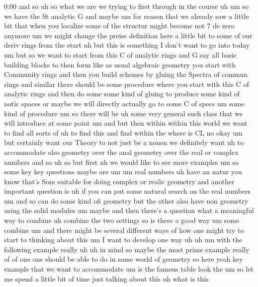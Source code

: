 \begin{unfinished}{0:00}
and
so
uh
so  what  we  are  we  trying  to  first
through  in  the
course
uh  um  so  we  have  the  St  analytic  G  and
maybe  um  for  reason  that  we  already  saw
a  little  bit  that  when  you
localize  some  of  the  structur  might
become  not  7  de  zero  anymore  um  we  might
change  the  preise  definition  here  a
little  bit  to  some  of  our  deriv  rings
from  the  start  uh  but  this  is  something
I  don't  want  to  go  into  today
um  but  so  we  want  to  start  from  this  C
of  analytic  rings  and  G  say  all  basic
building  blocks  to  then
form  like  as  usual  algebraic  geometry
you  start  with  Community  rings  and  then
you  build  schemes  by  gluing  the  Spectra
of  commun  rings  and  similar  there  should
be  some  procedure  where  you  start  with
this  C  of  analytic  rings  and  then  do
some  some  kind  of  gluing  to  produce  some
kind  of  notic  spaces  or  maybe  we  will
directly  actually  go  to  some  C  of
specs
um  some  kind  of
procedure
um
so  there  will  be
uh  some  very  general  such  class  that  we
will  introduce  at  some  point
um  and  but  then  within  within  this  world
we  want  to  find  all  sorts  of  uh  to
find  this  and  find  within
the
where  is
CL
no
okay  um  but  certainly  want  our  Theory  to
not  just  be  a  nonen  we  definitely  want
uh  to  accommodate  also  geometry  over  the
anal  geometry  over  the  real  or  complex
numbers  and
so  uh  so  but
first  uh  we  would  like  to  see  more
examples
um
so  some  key  key  questions  maybe
are
um
um  real
numbers  uh  have  an
natur  you  know  that's  Som  suitable  for
doing  complex  or  realic
geometry  and  another  important  question
is  uh  if  you  can  put  some  natural  search
on  the  real  numbers
um  and  so  can  do  some  kind  ofi  geometry
but  the  other  also  have  non  geometry
using  the  solid  modules  um  maybe  and
then  there's  a  question  what  a
meaningful  way  to  combine  uh  combine  the
two  settings  so  is  there  a  good
way  um  some  combine
um  and  there  might  be  several  different
ways  of  how  one  might  try  to  start  to
thinking  about  this  um  I  want  to  develop
one  way  uh
uh  um  with  the  following  example  really
uh  uh  in
mind  so  maybe  the  most  prime  example
really  of  of  one  one  should  be  able  to
do  in  some  world  of  geometry  so  here
yeah  key  example  that  we  want  to
accommodate  um  is  the  famous  table  look
the  um  so  let  me  spend  a  little  bit  of
time  just  talking  about  this
uh  what  is
this

\end{unfinished}
